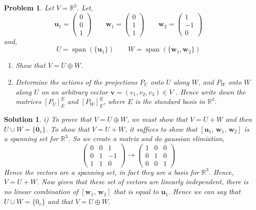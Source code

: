 \documentclass{article}
\newcommand{\R}{\mathbb{R}}
\renewcommand{\vec}[1]{\boldsymbol{\mathbf{#1}}}
\newcommand{\vecth}[3]{\begin{pmatrix} #1 \\ #2 \\ #3 \end{pmatrix}}
\newcommand{\thbth}[9]{\begin{pmatrix} #1 & #2 & #3 \\ #4 & #5 & #6 \\ #7 & #8 & #9\end{pmatrix}}
\newcommand{\iid}{\thbth 1 0 0 0 1 0 0 0 1}
\DeclareMathOperator{\spn}{span}
\newtheorem{problem}{Problem}
\newtheorem{solution}{Solution}
\begin{document}
\newpage
\begin{problem}
  Let $V = \R^3$. Let,
  $$ \vec u_1 = \vecth 0 0 1 \qquad \vec w_1 = \vecth 0 1 1 \qquad \vec w_2 = \vecth 1 {-1} 0$$
  and,
  $$ U = \spn (\{\vec u_1\}) \qquad W = \spn(\{\vec w_1, \vec w_2\}) $$
  \begin{enumerate}
    \item Show that $V = U \oplus W$.
    \item Determine the actions of the projections $P_U$ onto $U$ along $W$, and $P_W$ onto $W$ along $U$ on an arbitrary vector $\vec v = (v_1, v_2, v_3) \in V$ . Hence write down the matrices $[P_U]_E^E$ and $[P_W]_E^E$, where $E$ is the standard basis in $\R^3$.
  \end{enumerate}
\end{problem}
\begin{solution}
  i) To prove that $V = U \oplus W$, we must show that $V = U + W$ and then $U \cup W = \{\vec 0_v\}$. To show that $V = U + W$, it suffices to show that $[\vec u_1,\, \vec w_1,\, \vec w_2]$ is a spanning set for $\R^3$. So we create a matrix and do gaussian elimiation,
  $$ \thbth 0 0 1 0 1 {-1} 1 1 0 \to \iid $$
  Hence the vectors are a spanning set, in fact they are a basis for $\R^3$. Hence, $V = U + W$. Now given that these set of vectors are linearly independent, there is no linear combination of $[\vec w_1,\, \vec w_2]$ that is equal to $\vec u_1$. Hence we can say that $U \cup W = \{0_v\}$ and that $V = U \oplus W$.\\


\end{solution}
\end{document}
